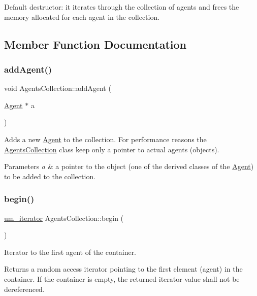 Default destructor\+: it iterates through the collection of agents and frees the memory allocated for each agent in the collection. 

\subsection{Member Function Documentation}
\mbox{\label{class_agents_collection_a51d14d0635dedd5971ea90dec4f9e7f3}} 
\subsubsection{\texorpdfstring{add\+Agent()}{addAgent()}}
{\footnotesize\ttfamily void Agents\+Collection\+::add\+Agent (\begin{DoxyParamCaption}\item[{\hyperlink{class_agent}{Agent} $\ast$}]{a }\end{DoxyParamCaption})}

Adds a new \hyperlink{class_agent}{Agent} to the collection. For performance reasons the \hyperlink{class_agents_collection}{Agents\+Collection} class keep only a pointer to actual agents (objects). 
\begin{DoxyParams}{Parameters}
{\em a} & a pointer to the object (one of the derived classes of the \hyperlink{class_agent}{Agent}) to be added to the collection. \\
\hline
\end{DoxyParams}
\mbox{\label{class_agents_collection_abc1d6593a3ed1c1c7b2d31b7efec8db8}} 
\subsubsection{\texorpdfstring{begin()}{begin()}}
{\footnotesize\ttfamily \hyperlink{_agents_collection_8h_afde47bc45d604b8b8c72755072376679}{um\+\_\+iterator} Agents\+Collection\+::begin (\begin{DoxyParamCaption}{ }\end{DoxyParamCaption})}

Iterator to the first agent of the container. \begin{DoxyReturn}{Returns}
a random access iterator pointing to the first element (agent) in the container. If the container is empty, the returned iterator value shall not be dereferenced. 
\end{DoxyReturn}
\mbox{\label{class_agents_collection_afd4d2e005b5e449637abd0fa022132a9}} 

